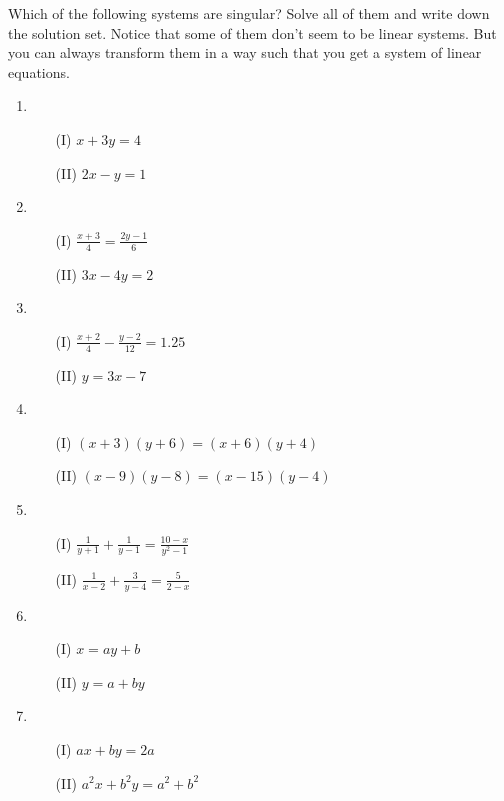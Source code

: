 \begin{exer}

Which of the following systems are singular? Solve all of them and write down the solution set. Notice that some of them don't seem to be linear systems. But you can always transform them in a way such that you get a system of linear equations. 

\begin{enumerate}[label=\emph{\alph*})]
\item
\begin{itemize}
\item[(I)] $x+3y=4$
\item[(II)] $2x-y=1$
\end{itemize}
\vfill

\item
\begin{itemize}
\item[(I)] $\frac{x+3}{4}=\frac{2y-1}{6}$
\item[(II)] $3x-4y=2$
\end{itemize}
\vfill

\newpage
\item
\begin{itemize}
\item[(I)] $\frac{x+2}{4}-\frac{y-2}{12}=1.25$
\item[(II)] $y=3x-7$
\end{itemize}
\vfill

\item
\begin{itemize}
\item[(I)] $(x+3)(y+6)=(x+6)(y+4)$
\item[(II)] $(x-9)(y-8)=(x-15)(y-4)$
\end{itemize}
\vfill


\item
\begin{itemize}
\item[(I)] $\frac{1}{y+1}+\frac{1}{y-1}=\frac{10-x}{y^2-1}$
\item[(II)] $\frac{1}{x-2}+\frac{3}{y-4}=\frac{5}{2-x}$
\end{itemize}
\vfill

\newpage
\item
\begin{itemize}
\item[(I)] $x=ay+b$
\item[(II)] $y=a+by$
\end{itemize}
\vfill


\item
\begin{itemize}
\item[(I)] $ax+by=2a$
\item[(II)] $a^2x+b^2y=a^2+b^2$
\end{itemize}
\vfill

\end{enumerate}
\end{exer}

